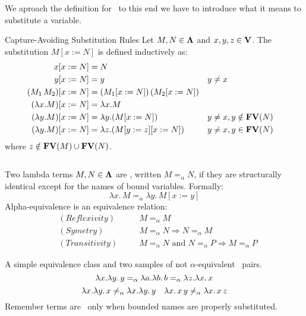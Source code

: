 \documentclass[12pt]{book}
\newcommand{\subst}[2]{[#1 := #2]}    %
\newcommand{\lam}[2]{\lambda #1.\,#2} %
\begin{document}
We aproach the definition for \aequiv \, to this end we have to introduce what it means to substitute a variable.

\begin{definition}Capture-Avoiding Substitution Rules
  Let \( M, N \in \mathbf{\Lambda} \) and \( x, y, z \in \mathbf{V} \). The substitution \( M[x := N] \) is defined inductively as:
  \[
    \begin{aligned}
      x[x := N]                       & = N \\
      y[x := N]                       & = y && y \neq x \\
      (M_1\, M_2)[x := N]             & = (M_1[x := N])\,(M_2[x := N]) \\
      (\lambda x. M)[x := N]          & = \lambda x. M \\
      (\lambda y. M)[x := N]          & = \lambda y. (M[x := N]) && y \neq x, y \notin \mathbf{FV}( N ) \\
      (\lambda y. M)[x := N]          & = \lambda z. (M[y := z][x := N]) && y \neq x, y \in \mathbf{FV}( N )
    \end{aligned}
  \]
  where \( z \notin \mathbf{FV}( M ) \cup \mathbf{FV}( N ) \).
  \begin{lstlisting}[style=haskellstyle,caption={asdasdasd}]

  \end{lstlisting}
\end{definition}
\begin{definition} Two lambda terms \( M, N \in \mathbf{\Lambda} \) are \aequivlt, written \( M =_\alpha N \), if they are structurally identical except for the names of bound variables.
  Formally:
  \[
    \lam{x}{M} =_\alpha \lam{y}{M\subst{x}{y}}
  \]
  Alpha-equivalence is an equivalence relation:
  \[
    \begin{aligned}
      &(Reflexivity) \quad && M =_\alpha M \\
      &(Symetry) \quad && M =_\alpha N \Rightarrow N =_\alpha M \\ 
      &(Transitivity) \quad && M =_\alpha N \text{ and } N =_\alpha P \Rightarrow M =_\alpha P
    \end{aligned}
  \]
\end{definition}
\begin{example} A simple equivalence class and two samples of not $\alpha$-equivalent \ pairs.
  \[
    \lambda x.\lambda y. \, y =_\alpha \lambda a.\lambda b. \, b =_\alpha \lambda z.\lambda x. \, x
  \]
  \[
    \lambda x. \lambda y. \, x \not=_\alpha \lambda x. \lambda y. \, y \quad \lambda x. \, x \, y \not=_\alpha \lambda x. \, x \, z 
  \]
  Remember terms are \aequiv \ only when bounded names are properly substituted.
\end{example}
\end{document}
